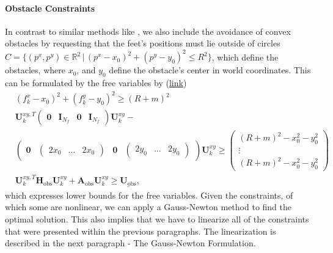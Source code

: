 \paragraph{Obstacle Constraints}
In contrast to similar methods like \cite{herdt2010walking}, we also include the avoidance of convex obstacles by requesting that the feet's positions must lie outside of circles $C = \{(p^x, p^y)\in\mathbb{R}^2 \,|\, (p^x-x_0)^2+(p^y-y_0)^2\leq R^2\}$, which define the obstacles, where $x_0$, and $y_0$ define the obstacle's center in world coordinates. This can be formulated by the free variables by (\href{https://github.com/mhubii/nmpc_pattern_generator/blob/dc1f5a9366cbbbf76f1b02cada642f6ac9a04c89/libs/pattern_generator/src/base_generator.cpp#L1271}{\underline{link}})
\begin{align}
	&(f_k^x-x_0)^2 + (f_k^y-y_0)^2 \geq (R + m)^2\\
	&\bm{U}_k^{xy,T}\begin{pmatrix}
	\bm{0} & \textbf{I}_{N_f} & \bm{0}& \textbf{I}_{N_f}
	\end{pmatrix}\bm{U}_k^{xy} - \\&\begin{pmatrix}
	\bm{0} & \begin{pmatrix}
	2x_0 & \dots & 2x_0
	\end{pmatrix} & \bm{0} & \begin{pmatrix}
	2y_0 & \dots & 2y_0
	\end{pmatrix}
	\end{pmatrix} \bm{U}_k^{xy}\geq \begin{pmatrix}
	(R + m)^2-x_0^2-y_0^2 \\
	\vdots \\
	(R + m)^2-x_0^2-y_0^2
	\end{pmatrix}\\
	&\bm{U}_k^{xy,T}\bm{H}_{\text{obs}}\bm{U}_k^{xy}+\bm{A}_{\text{obs}}\bm{U}_k^{xy} \geq \underline{\bm{U}_{\text{obs}}},
\end{align}
which expresses lower bounds for the free variables. Given the constraints, of which some are nonlinear, we can apply a Gauss-Newton method to find the optimal solution. This also implies that we have to linearize all of the constraints that were presented within the previous paragraphs. The linearization is described in the next paragraph - The Gauss-Newton Formulation.
